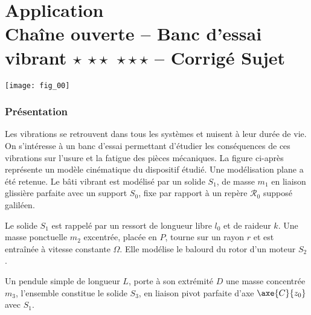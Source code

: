 \chapter*{Application  \\ 
Chaîne ouverte -- Banc d'essai vibrant \ifnormal $\star$ \else \fi \ifdifficile $\star\star$ \else \fi \iftdifficile $\star\star\star$ \else \fi
-- \ifprof Corrigé \else Sujet \fi}

\iflivret {} \else
\ifprof  {} \else \fi
\fi

\setcounter{question}{0}
%
\begin{marginfigure}
\texttt{[image: fig\_00]}
\end{marginfigure}


\subsection*{Présentation}
Les vibrations se retrouvent dans tous les systèmes et nuisent à leur durée de vie. On s’intéresse à un banc d’essai permettant d’étudier les conséquences de ces vibrations sur l’usure et la fatigue des pièces mécaniques.
La figure ci-après représente un modèle cinématique du dispositif étudié. Une modélisation plane a été retenue.
Le bâti vibrant est modélisé par un solide $S_1$, de masse $m_1$ en liaison glissière parfaite avec un support $S_0$, fixe par rapport à un repère $\mathcal{R}_0$ supposé galiléen.

Le solide $S_1$ est rappelé par un ressort de longueur libre $l_0$ et de raideur $k$.
Une masse ponctuelle $m_2$ excentrée, placée en $P$, tourne sur un rayon $r$ et est entraînée à vitesse constante $\Omega$. Elle modélise le 
balourd du rotor d’un moteur $S_2$.

Un pendule simple de longueur $L$, porte à son extrémité $D$ une masse concentrée $m_3$, l’ensemble constitue le solide $S_3$, en liaison pivot parfaite d’axe $\axe{C}{z_0}$ avec $S_1$.

